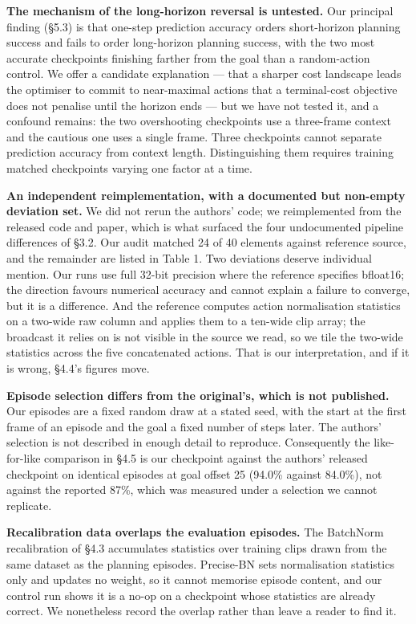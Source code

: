 \documentclass[10pt]{article}
\newcounter{none}
\begin{document}
\textbf{The mechanism of the long-horizon reversal is untested.} Our principal
finding (\S{}5.3) is that one-step prediction accuracy orders short-horizon
planning success and fails to order long-horizon planning success, with the two
most accurate checkpoints finishing farther from the goal than a random-action
control. We offer a candidate explanation --- that a sharper cost landscape leads
the optimiser to commit to near-maximal actions that a terminal-cost objective
does not penalise until the horizon ends --- but we have not tested it, and a
confound remains: the two overshooting checkpoints use a three-frame context and
the cautious one uses a single frame. Three checkpoints cannot separate
prediction accuracy from context length. Distinguishing them requires training
matched checkpoints varying one factor at a time.

\textbf{An independent reimplementation, with a documented but non-empty deviation
set.} We did not rerun the authors' code; we reimplemented from the released
code and paper, which is what surfaced the four undocumented pipeline
differences of \S{}3.2. Our audit matched 24 of 40 elements against reference source, and the remainder are listed in Table 1. Two deviations
deserve individual mention. Our runs use full 32-bit precision where the
reference specifies bfloat16; the direction favours numerical accuracy and
cannot explain a failure to converge, but it is a difference. And the reference
computes action normalisation statistics on a two-wide raw column and applies
them to a ten-wide clip array; the broadcast it relies on is not visible in the
source we read, so we tile the two-wide statistics across the five concatenated
actions. That is our interpretation, and if it is wrong, \S{}4.4's figures move.

\textbf{Episode selection differs from the original's, which is not published.} Our
episodes are a fixed random draw at a stated seed, with the start at the first
frame of an episode and the goal a fixed number of steps later. The authors'
selection is not described in enough detail to reproduce. Consequently the
like-for-like comparison in \S{}4.5 is our checkpoint against the authors' released
checkpoint on identical episodes at goal offset 25 (94.0\% against 84.0\%), not
against the reported 87\%, which was measured under a selection we cannot replicate.

\textbf{Recalibration data overlaps the evaluation episodes.} The BatchNorm
recalibration of \S{}4.3 accumulates statistics over training clips drawn from the
same dataset as the planning episodes. Precise-BN sets normalisation statistics
only and updates no weight, so it cannot memorise episode content, and our
control run shows it is a no-op on a checkpoint whose statistics are already
correct. We nonetheless record the overlap rather than leave a reader to find
it.
\end{document}
